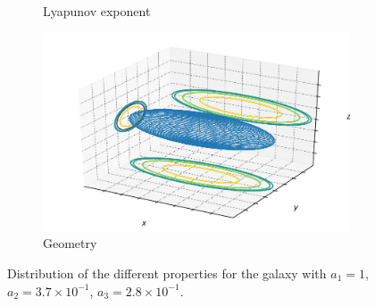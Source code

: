 \begin{figure}[h]
\begin{subfigure}[t]{0.4\textwidth}
        \caption{Lyapunov exponent}
    \end{subfigure}
    \begin{subfigure}[t]{0.4\textwidth}
        \includegraphics[width=\textwidth]{"../Files/Week 13/images/16_ellipsoid"}
        \caption{Geometry}
    \end{subfigure}
    \caption{Distribution of the different properties for the galaxy with $a_1 = 1$, $a_2 = 3.7\times10^{-1}$, $a_3 = 2.8\times10^{-1}$.}
    \label{fig: g19}
\end{figure}


